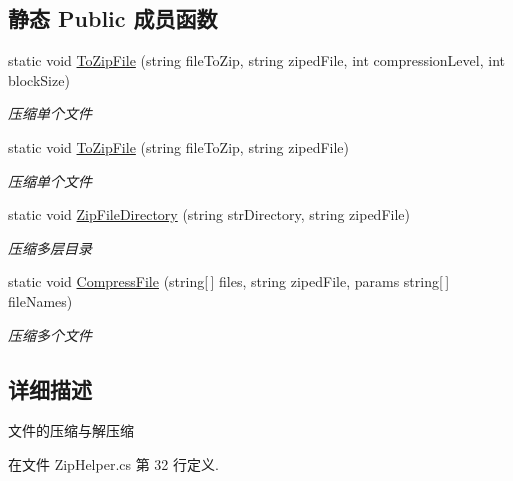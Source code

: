 \subsection*{静态 Public 成员函数}
\begin{DoxyCompactItemize}
\item 
static void \hyperlink{class_x_c_l_net_tools_1_1_file_handler_1_1_zip_helper_a4437b013f4b0db430cb1fd6097ed54a1}{To\-Zip\-File} (string file\-To\-Zip, string ziped\-File, int compression\-Level, int block\-Size)
\begin{DoxyCompactList}\small\item\em 压缩单个文件 \end{DoxyCompactList}\item 
static void \hyperlink{class_x_c_l_net_tools_1_1_file_handler_1_1_zip_helper_ab59c063455118d1eedb3a1af719db063}{To\-Zip\-File} (string file\-To\-Zip, string ziped\-File)
\begin{DoxyCompactList}\small\item\em 压缩单个文件 \end{DoxyCompactList}\item 
static void \hyperlink{class_x_c_l_net_tools_1_1_file_handler_1_1_zip_helper_a1231101acec5d274c2770115d1584ae3}{Zip\-File\-Directory} (string str\-Directory, string ziped\-File)
\begin{DoxyCompactList}\small\item\em 压缩多层目录 \end{DoxyCompactList}\item 
static void \hyperlink{class_x_c_l_net_tools_1_1_file_handler_1_1_zip_helper_abd0e8402a3d1ea9ca9f6c97cb46d5b89}{Compress\-File} (string\mbox{[}$\,$\mbox{]} files, string ziped\-File, params string\mbox{[}$\,$\mbox{]} file\-Names)
\begin{DoxyCompactList}\small\item\em 压缩多个文件 \end{DoxyCompactList}\end{DoxyCompactItemize}


\subsection{详细描述}
文件的压缩与解压缩 



在文件 Zip\-Helper.\-cs 第 32 行定义.



